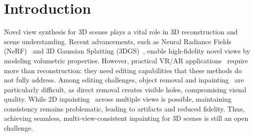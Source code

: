 \section{Introduction}
\label{sec:intro}


Novel view synthesis for 3D scenes plays a vital role in 3D reconstruction and scene understanding. Recent advancements, such as Neural Radiance Fields (NeRF)~\cite{mildenhall2021nerforiginal, barron2021mip, yu2021plenoctrees, muller2022instant, sun2022direct, fridovich2022plenoxels, martin2021nerf, reiser2021kilonerf, chen2022tensorf} and 3D Gaussian Splatting (3DGS)~\cite{yu2024mipsplat, qin2024langsplat, ye2023gaussiangrouping, kerbl202333dgs, chen2024surveygs}, enable high-fidelity novel views by modeling volumetric properties. However, practical VR/AR applications~\cite{macedo2021ar1, broll2022augmentedar2} require more than reconstruction: they need editing capabilities that these methods do not fully address. Among editing challenges, object removal and inpainting~\cite{wang2024gscream, lin2024maldnerf} are particularly difficult, as direct removal creates visible holes, compromising visual quality. While 2D inpainting~\cite{lama, corneanu2024latentpaint, lugmayr2022repaint, podell2023sdxl, xie2023smartbrush, yang2023paintbyexample, ldm, yang2023unipaint} across multiple views is possible, maintaining consistency remains problematic, leading to artifacts and reduced fidelity. Thus, achieving seamless, multi-view-consistent inpainting for 3D scenes is still an open challenge.


